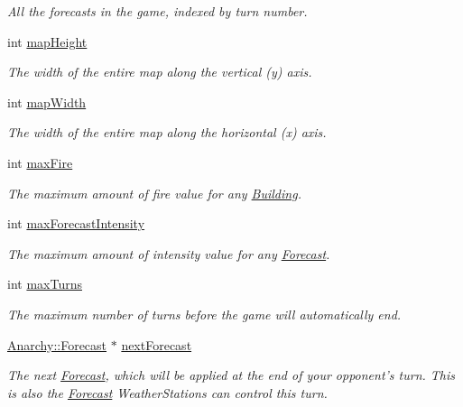 \begin{DoxyCompactItemize}
\begin{DoxyCompactList}\small\item\em All the forecasts in the game, indexed by turn number. \end{DoxyCompactList}\item 
int \hyperlink{classAnarchy_1_1Game_aaa29aba3235be8bcd5103507ce42b423}{map\-Height}
\begin{DoxyCompactList}\small\item\em The width of the entire map along the vertical (y) axis. \end{DoxyCompactList}\item 
int \hyperlink{classAnarchy_1_1Game_a7693a0b5c342b32fda1de11b1b03d541}{map\-Width}
\begin{DoxyCompactList}\small\item\em The width of the entire map along the horizontal (x) axis. \end{DoxyCompactList}\item 
int \hyperlink{classAnarchy_1_1Game_a306fca75bb8c449f1e17a1ec38c2ab97}{max\-Fire}
\begin{DoxyCompactList}\small\item\em The maximum amount of fire value for any \hyperlink{classAnarchy_1_1Building}{Building}. \end{DoxyCompactList}\item 
int \hyperlink{classAnarchy_1_1Game_a6565f400e8dcdeecb5466a76f3da9beb}{max\-Forecast\-Intensity}
\begin{DoxyCompactList}\small\item\em The maximum amount of intensity value for any \hyperlink{classAnarchy_1_1Forecast}{Forecast}. \end{DoxyCompactList}\item 
int \hyperlink{classAnarchy_1_1Game_a47e287119862163ec1bd33f0f5be15c0}{max\-Turns}
\begin{DoxyCompactList}\small\item\em The maximum number of turns before the game will automatically end. \end{DoxyCompactList}\item 
\hyperlink{classAnarchy_1_1Forecast}{Anarchy\-::\-Forecast} $\ast$ \hyperlink{classAnarchy_1_1Game_ab5709ad48347f087ca94fc6912be6da3}{next\-Forecast}
\begin{DoxyCompactList}\small\item\em The next \hyperlink{classAnarchy_1_1Forecast}{Forecast}, which will be applied at the end of your opponent's turn. This is also the \hyperlink{classAnarchy_1_1Forecast}{Forecast} Weather\-Stations can control this turn. \end{DoxyCompactList}\item 

\end{DoxyCompactItemize}
